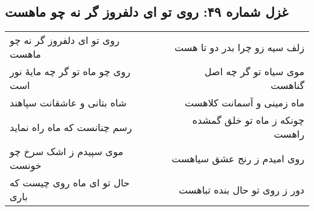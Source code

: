 \begin{center}
\section*{غزل شماره ۴۹: روی تو ای دلفروز گر نه چو ماهست}
\label{sec:049}
\begin{longtable}{l p{0.5cm} r}
روی تو ای دلفروز گر نه چو ماهست
&&
زلف سیه زو چرا بدر دو تا هست
\\
روی چو ماه تو گر چه مایهٔ نور است
&&
موی سیاه تو گر چه اصل گناهست
\\
شاه بتانی و عاشقانت سپاهند
&&
ماه زمینی و آسمانت کلاهست
\\
رسم چنانست که ماه راه نماید
&&
چونکه ز ماه تو خلق گمشده راهست
\\
موی سپیدم ز اشک سرخ چو خونست
&&
روی امیدم ز رنج عشق سیاهست
\\
حال تو ای ماه روی چیست که باری
&&
دور ز روی تو حال بنده تباهست
\\
\end{longtable}
\end{center}
